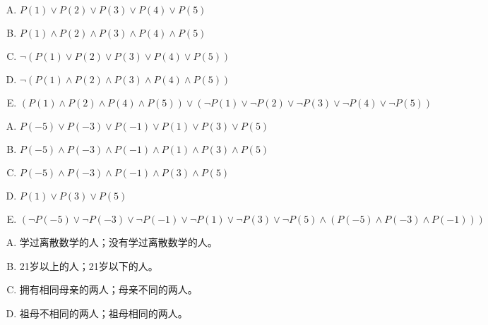 {{        %
        \begin{practices}
            \begin{enumerate}[A.]
                \item $P(1) \vee P(2) \vee P(3) \vee P(4) \vee P(5)$
                \item $P(1) \wedge P(2) \wedge P(3) \wedge P(4) \wedge P(5)$
                \item $\neg (P(1) \vee P(2) \vee P(3) \vee P(4) \vee P(5))$
                \item $\neg (P(1) \wedge P(2) \wedge P(3) \wedge P(4) \wedge P(5))$
                \item $(P(1) \wedge P(2) \wedge P(4) \wedge P(5)) \vee (\neg P(1) \vee \neg P(2) \vee \neg P(3) \vee \neg P(4) \vee \neg P(5))$
            \end{enumerate}
        \end{practices}

        \begin{practices}
            \begin{enumerate}[A.]
                \item $P(-5) \vee P(-3) \vee P(-1) \vee P(1) \vee P(3) \vee P(5)$
                \item $P(-5) \wedge P(-3) \wedge P(-1) \wedge P(1) \wedge P(3) \wedge P(5)$
                \item $P(-5) \wedge P(-3) \wedge P(-1) \wedge P(3) \wedge P(5)$
                \item $P(1) \vee P(3) \vee P(5)$
                \item $(\neg P(-5) \vee \neg P(-3) \vee \neg P(-1) \vee \neg P(1) \vee \neg P(3) \vee \neg P(5) \wedge (P(-5) \wedge P(-3) \wedge P(-1)))$
            \end{enumerate}
        \end{practices}

        \begin{practices}
            \begin{enumerate}[A.]
                \item 学过离散数学的人；没有学过离散数学的人。
                \item 21岁以上的人；21岁以下的人。
                \item 拥有相同母亲的两人；母亲不同的两人。
                \item 祖母不相同的两人；祖母相同的两人。
            \end{enumerate}
        \end{practices}

}}
